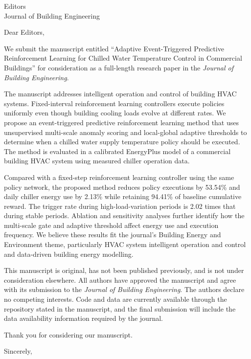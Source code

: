 \documentclass[11pt]{letter}
\begin{document}
\begin{letter}{Editors\\Journal of Building Engineering}

\opening{Dear Editors,}

We submit the manuscript entitled ``Adaptive Event-Triggered Predictive Reinforcement Learning for Chilled Water Temperature Control in Commercial Buildings'' for consideration as a full-length research paper in the \textit{Journal of Building Engineering}.

The manuscript addresses intelligent operation and control of building HVAC systems. Fixed-interval reinforcement learning controllers execute policies uniformly even though building cooling loads evolve at different rates. We propose an event-triggered predictive reinforcement learning method that uses unsupervised multi-scale anomaly scoring and local-global adaptive thresholds to determine when a chilled water supply temperature policy should be executed. The method is evaluated in a calibrated EnergyPlus model of a commercial building HVAC system using measured chiller operation data.

Compared with a fixed-step reinforcement learning controller using the same policy network, the proposed method reduces policy executions by 53.54\% and daily chiller energy use by 2.13\% while retaining 94.41\% of baseline cumulative reward. The trigger rate during high-load-variation periods is 2.02 times that during stable periods. Ablation and sensitivity analyses further identify how the multi-scale gate and adaptive threshold affect energy use and execution frequency. We believe these results fit the journal's Building Energy and Environment theme, particularly HVAC system intelligent operation and control and data-driven building energy modelling.

This manuscript is original, has not been published previously, and is not under consideration elsewhere. All authors have approved the manuscript and agree with its submission to the \textit{Journal of Building Engineering}. The authors declare no competing interests. Code and data are currently available through the repository stated in the manuscript, and the final submission will include the data availability information required by the journal.

Thank you for considering our manuscript.

\closing{Sincerely,}

\end{letter}
\end{document}
